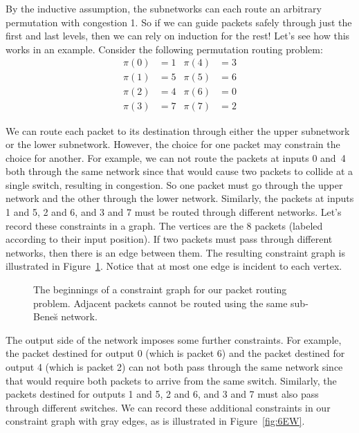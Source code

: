 By the inductive assumption, the subnetworks can each route an
arbitrary permutation with congestion 1.  So if we can guide packets
safely through just the first and last levels, then we can rely on
induction for the rest!  Let's see how this works in an example.
Consider the following permutation routing problem:
%
\begin{align*}
\pi(0) & = 1 & \pi(4) & = 3 \\
\pi(1) & = 5 & \pi(5) & = 6 \\
\pi(2) & = 4 & \pi(6) & = 0 \\
\pi(3) & = 7 & \pi(7) & = 2
\end{align*}

We can route each packet to its destination through either the upper
subnetwork or the lower subnetwork.  However, the choice for one
packet may constrain the choice for another.  For example, we can not
route the packets at inputs 0 and~4 both through the same network
since that would cause two packets to collide at a single switch,
resulting in congestion.  So one packet must go through the upper
network and the other through the lower network.  Similarly, the
packets at inputs 1 and 5, 2 and 6, and 3 and 7 must be routed through
different networks.  Let's record these constraints in a graph.  The
vertices are the 8 packets (labeled according to their input
position).  If two packets must pass through different networks, then
there is an edge between them.  The resulting constraint graph is
illustrated in Figure~\ref{fig:6EV}.  Notice that at most one edge is
incident to each vertex.

\begin{figure}


\caption{The beginnings of a constraint graph for our packet routing
  problem.  Adjacent packets cannot be routed using the same
  sub-Bene\u{s} network.}

\label{fig:6EV}

\end{figure}

The output side of the network imposes some further constraints.  For
example, the packet destined for output 0 (which is packet 6) and the
packet destined for output 4 (which is packet 2) can not both pass
through the same network since that would require both packets to
arrive from the same switch.  Similarly, the packets destined for
outputs 1 and 5, 2 and 6, and 3 and 7 must also pass through different
switches.  We can record these additional constraints in our
constraint graph with gray edges, as is illustrated in
Figure~\ref{fig:6EW}.

